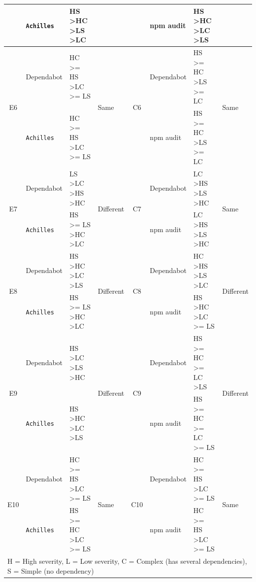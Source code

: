 \documentclass[conference]{IEEEtran}
\begin{document}
\begin{table}
\begin{tabular}{clll|clll}
			& \texttt{Achilles}      & HS \textgreater HC \textgreater LS \textgreater LC       & & & npm audit & HS \textgreater HC \textgreater LC \textgreater LS & \\ \midrule
			\multirow{2}{*}{E6}   & Dependabot    & HC \textgreater{}= HS \textgreater LC \textgreater{}= LS & \multirow{2}{*}{Same} & \multirow{2}{*}{C6} & Dependabot & HS \textgreater{}= HC \textgreater LS \textgreater{}= LC & \multirow{2}{*}{Same} \\ 
			& \texttt{Achilles}      & HC \textgreater{}= HS \textgreater LC \textgreater{}= LS & & & npm audit & HS \textgreater{}= HC \textgreater LS \textgreater{}= LC & \\ \midrule
			\multirow{2}{*}{E7}   & Dependabot    & LS \textgreater LC \textgreater HS \textgreater HC       & \multirow{2}{*}{Different} & \multirow{2}{*}{C7} & Dependabot & LC \textgreater HS \textgreater LS \textgreater HC& \multirow{2}{*}{Same} \\ 
			& \texttt{Achilles}      & HS \textgreater{}= LS \textgreater HC \textgreater LC    & & & npm audit & LC \textgreater HS \textgreater LS \textgreater HC& \\ \midrule
			\multirow{2}{*}{E8}   & Dependabot    & HS \textgreater HC \textgreater LC \textgreater LS       & \multirow{2}{*}{Different} & \multirow{2}{*}{C8}  & Dependabot & HC \textgreater HS \textgreater LS \textgreater LC & \multirow{2}{*}{Different} \\ 
			& \texttt{Achilles}      & HS \textgreater{}= LS \textgreater HC \textgreater LC    & & & npm audit & HS \textgreater HC \textgreater LC \textgreater{}= LS & \\ \midrule
			\multirow{2}{*}{E9}   & Dependabot    & HS \textgreater LC \textgreater LS \textgreater HC       & \multirow{2}{*}{Different} & \multirow{2}{*}{C9} & Dependabot & HS \textgreater{}= HC \textgreater{}= LC \textgreater LS  & \multirow{2}{*}{Different} \\ 
			& \texttt{Achilles}      & HS \textgreater HC \textgreater LC \textgreater LS       & & & npm audit & HS \textgreater{}= HC \textgreater{}= LC \textgreater{}= LS & \\ \midrule
			\multirow{2}{*}{E10}  & Dependabot    & HC \textgreater{}= HS \textgreater LC \textgreater{}= LS & \multirow{2}{*}{Same} & \multirow{2}{*}{C10} & Dependabot & HC \textgreater{}= HS \textgreater LC \textgreater{}= LS & \multirow{2}{*}{Same} \\ 
			& \texttt{Achilles}      & HS \textgreater{}= HC \textgreater LC \textgreater{}= LS & & & npm audit & HC \textgreater{}= HS \textgreater LC \textgreater{}= LS & \\ \midrule
			\multicolumn{8}{l}{H = High severity, L = Low severity, C = Complex (has several dependencies), S = Simple (no dependency)} \\
		\end{tabular}
		\label{table:result-Ach-t1}
	\end{table}
	
\end{document}
